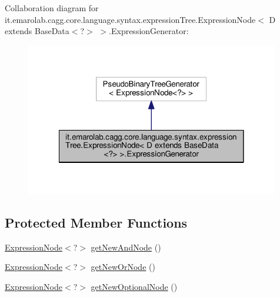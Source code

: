 Collaboration diagram for it.\-emarolab.\-cagg.\-core.\-language.\-syntax.\-expression\-Tree.\-Expression\-Node$<$ D extends Base\-Data$<$?$>$ $>$.Expression\-Generator\-:\nopagebreak
\begin{figure}[H]
\begin{center}
\leavevmode
\includegraphics[width=314pt]{classit_1_1emarolab_1_1cagg_1_1core_1_1language_1_1syntax_1_1expressionTree_1_1ExpressionNode_3_3c4437144f11720608c02efbc9aa088e}
\end{center}
\end{figure}
\subsection*{Protected Member Functions}
\begin{DoxyCompactItemize}
\item 
\hyperlink{classit_1_1emarolab_1_1cagg_1_1core_1_1language_1_1syntax_1_1expressionTree_1_1ExpressionNode_3_3eaf7c0f6a4bc47f4823e05ca883c5af_acfac8736e19e954def3e135de75d668e}{Expression\-Node}$<$?$>$ \hyperlink{classit_1_1emarolab_1_1cagg_1_1core_1_1language_1_1syntax_1_1expressionTree_1_1ExpressionNode_3_1b62a0c49b9a1ba31afa9c9176f7217e_adb535a2b44ed8494a4ad641f817eadde}{get\-New\-And\-Node} ()
\item 
\hyperlink{classit_1_1emarolab_1_1cagg_1_1core_1_1language_1_1syntax_1_1expressionTree_1_1ExpressionNode_3_3eaf7c0f6a4bc47f4823e05ca883c5af_acfac8736e19e954def3e135de75d668e}{Expression\-Node}$<$?$>$ \hyperlink{classit_1_1emarolab_1_1cagg_1_1core_1_1language_1_1syntax_1_1expressionTree_1_1ExpressionNode_3_1b62a0c49b9a1ba31afa9c9176f7217e_ae57656f4227da9091e27ae20adb23d43}{get\-New\-Or\-Node} ()
\item 
\hyperlink{classit_1_1emarolab_1_1cagg_1_1core_1_1language_1_1syntax_1_1expressionTree_1_1ExpressionNode_3_3eaf7c0f6a4bc47f4823e05ca883c5af_acfac8736e19e954def3e135de75d668e}{Expression\-Node}$<$?$>$ \hyperlink{classit_1_1emarolab_1_1cagg_1_1core_1_1language_1_1syntax_1_1expressionTree_1_1ExpressionNode_3_1b62a0c49b9a1ba31afa9c9176f7217e_a39444c081cdf1ab7adfba11fdea67134}{get\-New\-Optional\-Node} ()
\end{DoxyCompactItemize}
